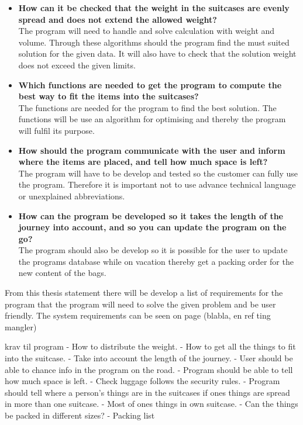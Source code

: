 \begin{itemize}
\item \textbf{How can it be checked that the weight in the suitcases are evenly spread and does not extend the allowed weight?}\\

The program will need to handle and solve calculation with weight and volume. Through these algorithms should the program find the must suited solution for the given data. It will also have to check that the solution weight does not exceed the given limits.

\item \textbf{Which functions are needed to get the program to compute the best way to fit the items into the suitcases?}\\

The functions are needed for the program to find the best solution. The functions will be use an algorithm for optimising and thereby the program will fulfil its purpose.

\item \textbf{How should the program communicate with the user and inform where the items are placed, and tell how much space is left?}\\

The program will have to be develop and tested so the customer can fully use the program. Therefore it is important not to use advance technical language or unexplained abbreviations.

\item \textbf{How can the program be developed so it takes the length of the journey  into account, and so you can update the program on the go?}\\

The program should also be develop so it is possible for the user to update the programs database while on vacation thereby get a packing order for the new content of the bags.
\end{itemize}

From this thesis statement there will be develop a list of requirements for the program that the program will need to solve the given problem and be user friendly. The system requirements can be seen on page (blabla, en ref ting mangler)

krav til program
-	How to distribute the weight.
-	How to get all the things to fit into the suitcase.
-	Take into account the length of the journey.
-	User should be able to chance info in the program on the road.
-	Program should be able to tell how much space is left.
-	Check luggage follows the security rules.
-	Program should tell where a person’s things are in the suitcases if ones things are spread in more than one suitcase.
-	Most of ones things in own suitcase.
-	Can the things be packed in different sizes?
-	Packing list


